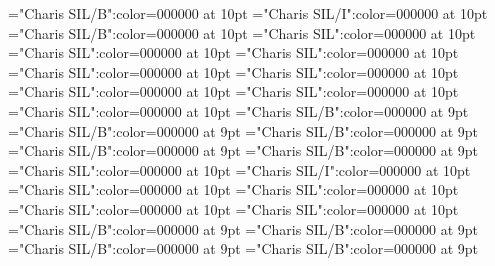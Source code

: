 \documentclass{article}
\begin{document}
 
\thispagestyle{empty} 
\font\FocusedMcbLexSensepublishRootSocioLinguisticsNotePubentryletDatadicBody="Charis SIL/B":color=000000 at 10pt
\font\EmphasizedTextLexSensepublishRootSocioLinguisticsNotePubentryletDatadicBody="Charis SIL/I":color=000000 at 10pt
\font\mcbLexSensepublishRootSocioLinguisticsNotePubentryletDatadicBody="Charis SIL/B":color=000000 at 10pt
\font\spanLexSensepublishRootSocioLinguisticsNotePubentryletDatadicBody="Charis SIL":color=000000 at 10pt
\font\LexSensepublishRootSocioLinguisticsNotePubafterentryletDatadicBody="Charis SIL":color=000000 at 10pt
\font\LexSensepublishRootSocioLinguisticsNotePubentryletDatadicBody="Charis SIL":color=000000 at 10pt
\font\xitemxitemexamplesbeforeexamplessensebsensesentryletDatadicBody="Charis SIL":color=000000 at 10pt
\font\spantranslationtranslationsxitemexamplessensebsensesentryletDatadicBody="Charis SIL":color=000000 at 10pt
\font\translationaftertranslationsxitemexamplessensebsensesentryletDatadicBody="Charis SIL":color=000000 at 10pt
\font\translationtranslationsxitemexamplessensebsensesentryletDatadicBody="Charis SIL":color=000000 at 10pt
\font\translationsxitemexamplessensebsensesentryletDatadicBody="Charis SIL":color=000000 at 10pt
\font\FocusedMcbexamplexitemexamplessensebsensesentryletDatadicBody="Charis SIL/B":color=000000 at 9pt
\font\mcbexamplexitemexamplessensebsensesentryletDatadicBody="Charis SIL/B":color=000000 at 9pt
\font\exampleafterxitemexamplessensebsensesentryletDatadicBody="Charis SIL/B":color=000000 at 9pt
\font\examplebeforexitemexamplessensebsensesentryletDatadicBody="Charis SIL/B":color=000000 at 9pt
\font\examplexitemexamplessensebsensesentryletDatadicBody="Charis SIL/B":color=000000 at 9pt
\font\xitemexamplessensebsensesentryletDatadicBody="Charis SIL":color=000000 at 10pt
\font\EmphasizedTexttranslationtranslationsexamplessensesensesentryletDatadicBody="Charis SIL/I":color=000000 at 10pt
\font\spantranslationtranslationsexamplessensesensesentryletDatadicBody="Charis SIL":color=000000 at 10pt
\font\translationaftertranslationsexamplessensesensesentryletDatadicBody="Charis SIL":color=000000 at 10pt
\font\translationtranslationsexamplessensesensesentryletDatadicBody="Charis SIL":color=000000 at 10pt
\font\translationsexamplessensesensesentryletDatadicBody="Charis SIL":color=000000 at 10pt
\font\FocusedMcbexampleexamplessensesensesentryletDatadicBody="Charis SIL/B":color=000000 at 9pt
\font\mcbexampleexamplessensesensesentryletDatadicBody="Charis SIL/B":color=000000 at 9pt
\font\exampleafterexamplessensesensesentryletDatadicBody="Charis SIL/B":color=000000 at 9pt
\font\examplebeforeexamplessensesensesentryletDatadicBody="Charis SIL/B":color=000000 at 9pt
\end{document}
